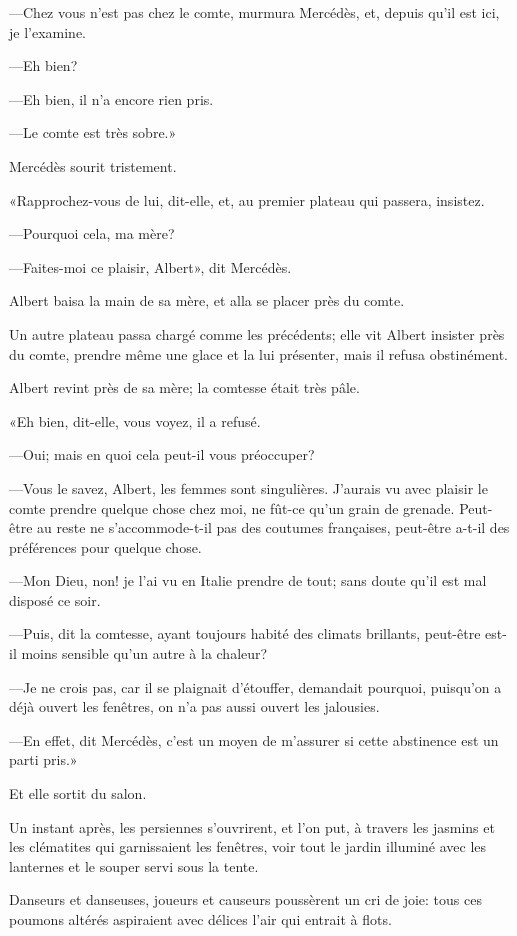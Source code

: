 —Chez vous n'est pas chez le comte, murmura Mercédès, et, depuis qu'il est ici, je l'examine. 

—Eh bien? 

—Eh bien, il n'a encore rien pris. 

—Le comte est très sobre.» 

Mercédès sourit tristement. 

«Rapprochez-vous de lui, dit-elle, et, au premier plateau qui passera, insistez. 

—Pourquoi cela, ma mère? 

—Faites-moi ce plaisir, Albert», dit Mercédès. 

Albert baisa la main de sa mère, et alla se placer près du comte. 

Un autre plateau passa chargé comme les précédents; elle vit Albert insister près du comte, prendre même une glace et la lui présenter, mais il refusa obstinément. 

Albert revint près de sa mère; la comtesse était très pâle. 

«Eh bien, dit-elle, vous voyez, il a refusé. 

—Oui; mais en quoi cela peut-il vous préoccuper? 

—Vous le savez, Albert, les femmes sont singulières. J'aurais vu avec plaisir le comte prendre quelque chose chez moi, ne fût-ce qu'un grain de grenade. Peut-être au reste ne s'accommode-t-il pas des coutumes françaises, peut-être a-t-il des préférences pour quelque chose. 

—Mon Dieu, non! je l'ai vu en Italie prendre de tout; sans doute qu'il est mal disposé ce soir. 

—Puis, dit la comtesse, ayant toujours habité des climats brillants, peut-être est-il moins sensible qu'un autre à la chaleur? 

—Je ne crois pas, car il se plaignait d'étouffer, demandait pourquoi, puisqu'on a déjà ouvert les fenêtres, on n'a pas aussi ouvert les jalousies. 

—En effet, dit Mercédès, c'est un moyen de m'assurer si cette abstinence est un parti pris.» 

Et elle sortit du salon. 

Un instant après, les persiennes s'ouvrirent, et l'on put, à travers les jasmins et les clématites qui garnissaient les fenêtres, voir tout le jardin illuminé avec les lanternes et le souper servi sous la tente. 

Danseurs et danseuses, joueurs et causeurs poussèrent un cri de joie: tous ces poumons altérés aspiraient avec délices l'air qui entrait à flots. 

